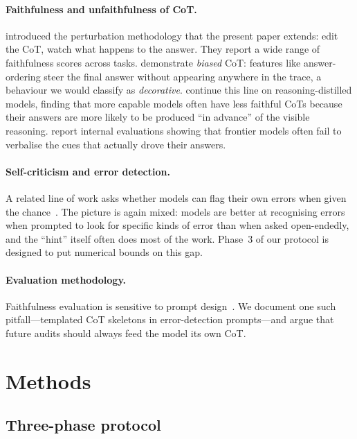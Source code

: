 \documentclass[11pt]{article}
\begin{document}
\paragraph{Faithfulness and unfaithfulness of CoT.} \citet{lanham2023measuring} introduced the perturbation methodology that the present paper extends: edit the CoT, watch what happens to the answer. They report a wide range of faithfulness scores across tasks. \citet{turpin2023language} demonstrate \emph{biased} CoT: features like answer-ordering steer the final answer without appearing anywhere in the trace, a behaviour we would classify as \emph{decorative}. \citet{chen2025reasoning} continue this line on reasoning-distilled models, finding that more capable models often have less faithful CoTs because their answers are more likely to be produced ``in advance'' of the visible reasoning. \citet{anthropic2025faithfulness} report internal evaluations showing that frontier models often fail to verbalise the cues that actually drove their answers.

\paragraph{Self-criticism and error detection.} A related line of work asks whether models can flag their own errors when given the chance~\citep{huang2023large,kadavath2022language,saunders2022self}. The picture is again mixed: models are better at recognising errors when prompted to look for specific kinds of error than when asked open-endedly, and the ``hint'' itself often does most of the work. Phase~3 of our protocol is designed to put numerical bounds on this gap.

\paragraph{Evaluation methodology.} Faithfulness evaluation is sensitive to prompt design~\citep{atanasova2023faithfulness}. We document one such pitfall---templated CoT skeletons in error-detection prompts---and argue that future audits should always feed the model its own CoT.

\section{Methods}

\subsection{Three-phase protocol}
\end{document}
